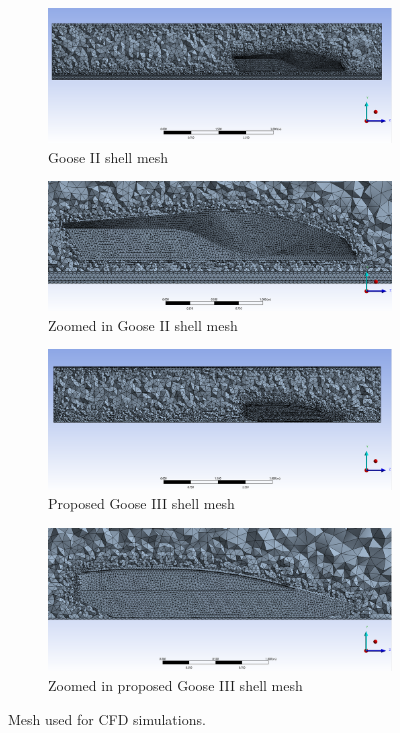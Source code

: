 \documentclass[main.tex]{subfiles}
\begin{document}
\begin{figure}
\centering
\begin{subfigure}[h]{0.72\textwidth}
\includegraphics[width=\textwidth]{images/Goose_2_Mesh.png}
\caption{Goose II shell mesh}
\end{subfigure}
\begin{subfigure}[h]{0.72\textwidth}
\includegraphics[width=\textwidth]{images/Goose_2_Mesh2.png}
\caption{Zoomed in Goose II shell mesh}
\end{subfigure}
\begin{subfigure}[h]{0.72\textwidth}
\includegraphics[width=\textwidth]{images/Victor_Mesh.png}
\caption{Proposed Goose III shell mesh}
\end{subfigure}
\begin{subfigure}[h]{0.72\textwidth}
\includegraphics[width=\textwidth]{images/Victor_Mesh2.png}
\caption{Zoomed in proposed Goose III shell mesh}
\end{subfigure}
\caption{Mesh used for CFD simulations.}
\label{fig:cfdmesh}
\end{figure}
\end{document}
